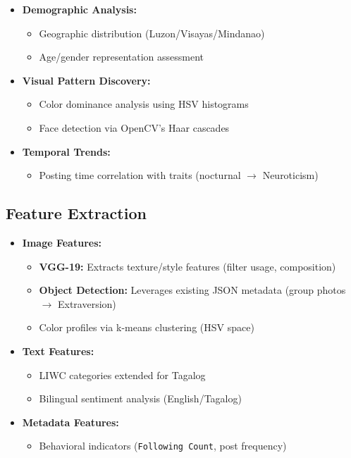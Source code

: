 \begin{itemize}
	\item \textbf{Demographic Analysis:} 
	\begin{itemize}
		\item Geographic distribution (Luzon/Visayas/Mindanao)
		\item Age/gender representation assessment
	\end{itemize}
	
	\item \textbf{Visual Pattern Discovery:}
	\begin{itemize}
		\item Color dominance analysis using HSV histograms
		\item Face detection via OpenCV's Haar cascades
	\end{itemize}
	
	\item \textbf{Temporal Trends:}
	\begin{itemize}
		\item Posting time correlation with traits (nocturnal $\rightarrow$ Neuroticism)
	\end{itemize}
\end{itemize}

\subsection{Feature Extraction}
\label{subsec:features}

\begin{itemize}
	\item \textbf{Image Features:}
	\begin{itemize}
		\item \textbf{VGG-19:} Extracts texture/style features (filter usage, composition)
		\item \textbf{Object Detection:} Leverages existing JSON metadata (group photos $\rightarrow$ Extraversion)
		\item Color profiles via k-means clustering (HSV space)
	\end{itemize}
	
	\item \textbf{Text Features:}
	\begin{itemize}
		\item LIWC categories extended for Tagalog
		\item Bilingual sentiment analysis (English/Tagalog)
	\end{itemize}
	
	\item \textbf{Metadata Features:}
	\begin{itemize}
		\item Behavioral indicators (\texttt{Following Count}, post frequency)
	\end{itemize}
\end{itemize}

